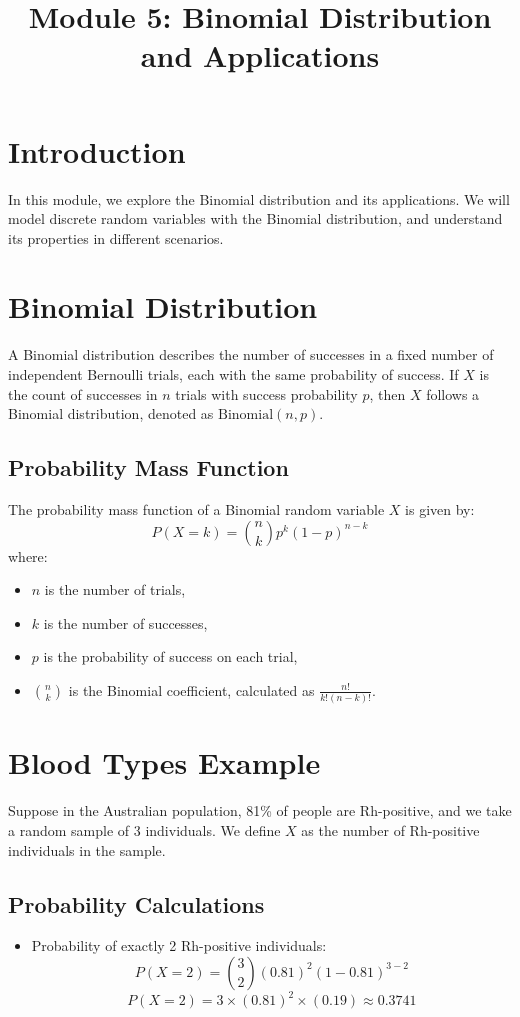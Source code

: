 \documentclass{article}
\begin{document}
\title{Module 5: Binomial Distribution and Applications}
\author{}
\date{}
\maketitle

\section{Introduction}
In this module, we explore the Binomial distribution and its applications. We will model discrete random variables with the Binomial distribution, and understand its properties in different scenarios.

\section{Binomial Distribution}
A Binomial distribution describes the number of successes in a fixed number of independent Bernoulli trials, each with the same probability of success. If \( X \) is the count of successes in \( n \) trials with success probability \( p \), then \( X \) follows a Binomial distribution, denoted as \( \text{Binomial}(n, p) \).

\subsection{Probability Mass Function}
The probability mass function of a Binomial random variable \( X \) is given by:
\[
P(X = k) = \binom{n}{k} p^k (1-p)^{n-k}
\]
where:
\begin{itemize}
    \item \( n \) is the number of trials,
    \item \( k \) is the number of successes,
    \item \( p \) is the probability of success on each trial,
    \item \( \binom{n}{k} \) is the Binomial coefficient, calculated as \( \frac{n!}{k!(n-k)!} \).
\end{itemize}

\section{Blood Types Example}
Suppose in the Australian population, 81\% of people are Rh-positive, and we take a random sample of 3 individuals. We define \( X \) as the number of Rh-positive individuals in the sample.

\subsection{Probability Calculations}
\begin{itemize}
    \item Probability of exactly 2 Rh-positive individuals:
    \[
    P(X = 2) = \binom{3}{2} (0.81)^2 (1-0.81)^{3-2}
    \]
    \[
    P(X = 2) = 3 \times (0.81)^2 \times (0.19) \approx 0.3741
    \]
\end{itemize}
\end{document}
